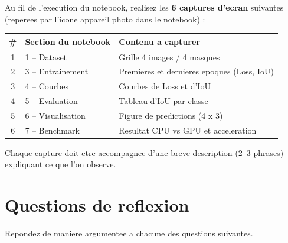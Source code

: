 \documentclass[12pt,a4paper]{article}
\begin{document}
Au fil de l'execution du notebook, realisez les \textbf{6 captures d'ecran}
suivantes (reperees par l'icone appareil photo dans le notebook) :

\begin{center}
\begin{tabular}{cll}
  \toprule
  \textbf{\#} & \textbf{Section du notebook} & \textbf{Contenu a capturer} \\
  \midrule
  1 & 1 -- Dataset            & Grille 4 images / 4 masques \\
  2 & 3 -- Entrainement       & Premieres et dernieres epoques (Loss, IoU) \\
  3 & 4 -- Courbes            & Courbes de Loss et d'IoU \\
  4 & 5 -- Evaluation         & Tableau d'IoU par classe \\
  5 & 6 -- Visualisation      & Figure de predictions (4 x 3) \\
  6 & 7 -- Benchmark          & Resultat CPU vs GPU et acceleration \\
  \bottomrule
\end{tabular}
\end{center}

\begin{infobox}
  Chaque capture doit etre accompagnee d'une breve description (2--3 phrases)
  expliquant ce que l'on observe.
\end{infobox}

\section{Questions de reflexion}

Repondez de maniere argumentee a chacune des questions suivantes.
\end{document}
